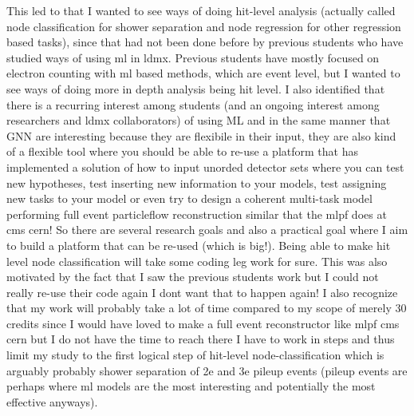 {This led to that I wanted to see ways of doing hit-level analysis (actually called node classification for shower separation and node regression for other regression based tasks), since that had not been done before by previous students who have studied ways of using ml in ldmx. Previous students have mostly focused on electron counting with ml based methods, which are event level, but I wanted to see ways of doing more in depth analysis being hit level. I also identified that there is a recurring interest among students (and an ongoing interest among researchers and ldmx collaborators) of using ML and in the same manner that GNN are interesting because they are flexibile in their input, they are also kind of a flexible tool where you should be able to re-use a platform that has implemented a solution of how to input unorded detector sets where you can test new hypotheses, test inserting new information to your models, test assigning new tasks to your model or even try to design a coherent multi-task model performing full event particleflow reconstruction similar that the mlpf does at cms cern! So there are several research goals and also a practical goal where I aim to build a platform that can be re-used (which is big!). Being able to make hit level node classification will take some coding leg work for sure. This was also motivated by the fact that I saw the previous students work but I could not really re-use their code again I dont want that to happen again! I also recognize that my work will probably take a lot of time compared to my scope of merely 30 credits since I would have loved to make a full event reconstructor like mlpf cms cern but I do not have the time to reach there I have to work in steps and thus limit my study to the first logical step of hit-level node-classification which is arguably probably shower separation of 2e and 3e pileup events (pileup events are perhaps where ml models are the most interesting and potentially the most effective anyways). 

}
